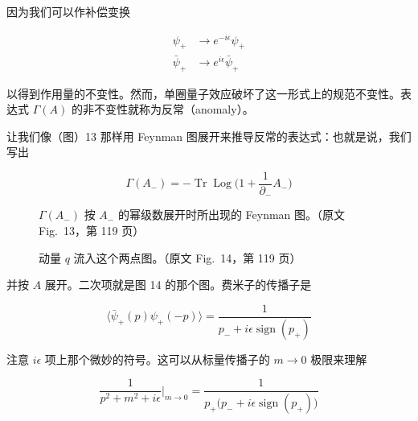 因为我们可以作补偿变换

\begin{equation}
  \begin{aligned}
    \psi_+ &\to e^{-i\epsilon}\psi_+\\
    \bar\psi_+ &\to e^{i\epsilon}\bar\psi_+
  \end{aligned}
  \tag{4.103}
  \label{eq:4.103}
\end{equation}

以得到作用量的不变性。然而，单圈量子效应破坏了这一形式上的规范不变性。表达式 $\Gamma(A)$ 的非不变性就称为反常（anomaly）。

让我们像（图）13 那样用 Feynman 图展开来推导反常的表达式：也就是说，我们写出

\begin{equation}
  \Gamma(A_-)=-\operatorname{Tr}\operatorname{Log}\Big(1+\frac{1}{\partial_-}A_-\Big)
  \tag{4.104}
  \label{eq:4.104}
\end{equation}

\begin{figure}[htbp]
  \centering
  \MissingFigureNote
  \caption{$\Gamma(A_-)$ 按 $A_-$ 的幂级数展开时所出现的 Feynman 图。（原文 Fig.~13，第 119 页）}
  \label{fig:13}
\end{figure}

\begin{figure}[htbp]
  \centering
  \MissingFigureNote
  \caption{动量 $q$ 流入这个两点图。（原文 Fig.~14，第 119 页）}
  \label{fig:14}
\end{figure}

并按 $A$ 展开。二次项就是图 14 的那个图。费米子的传播子是

\begin{equation}
  \langle\bar\psi_+(p)\psi_+(-p)\rangle=\frac{1}{p_-+i\epsilon\operatorname{sign}(p_+)}
  \tag{4.105}
  \label{eq:4.105}
\end{equation}

注意 $i\epsilon$ 项上那个微妙的符号。这可以从标量传播子的 $m\to0$ 极限来理解

\begin{equation}
  \frac{1}{p^2+m^2+i\epsilon}\Big|_{m\to0}=\frac{1}{p_+\big(p_-+i\epsilon\operatorname{sign}(p_+)\big)}
  \tag{4.106}
  \label{eq:4.106}
\end{equation}

